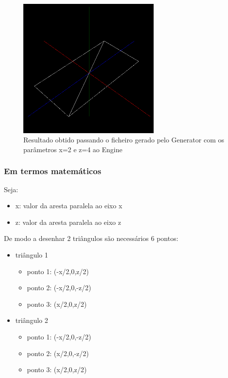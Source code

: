 \documentclass{article}
\begin{document}
\begin{figure}[ht!]
\centering
\includegraphics[height=7cm]{plane.png}
\caption{Resultado obtido passando o ficheiro gerado pelo Generator com os parâmetros x=2 e z=4 ao Engine}
\end{figure}

\subsubsection{Em termos matemáticos}
Seja:
\begin{itemize}
    \item x: valor da aresta paralela ao eixo x
    \item z: valor da aresta paralela ao eixo z
\end{itemize}
De modo a desenhar 2 triângulos são necessários 6 pontos:
\begin{itemize}
    \item triângulo 1
        \begin{itemize}
            \item ponto 1: (-x/2,0,z/2)
            \item ponto 2: (-x/2,0,-z/2)
            \item ponto 3: (x/2,0,z/2)
        \end{itemize}
    \item triângulo 2
        \begin{itemize}
            \item ponto 1: (-x/2,0,-z/2)
            \item ponto 2: (x/2,0,-z/2)
            \item ponto 3: (x/2,0,z/2)
        \end{itemize}
\end{itemize}
\end{document}
